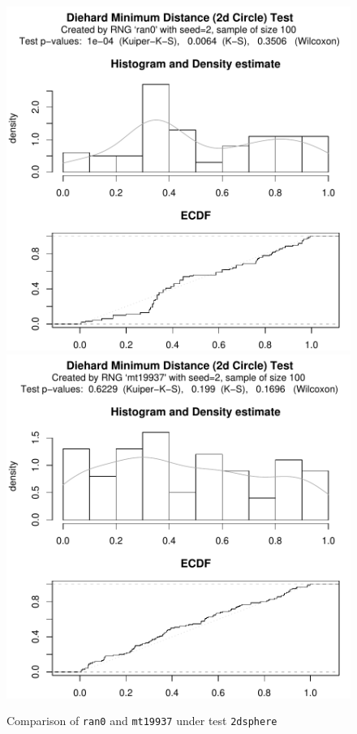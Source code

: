 \documentclass[12pt]{article}
\begin{document}
\begin{figure}[htbp]
  \begin{center}
%
\includegraphics{RDieHarder-rd-example}
\includegraphics{RDieHarder-rd-example1}
% 
\caption{Comparison of \texttt{ran0} and \texttt{mt19937} under test \texttt{2dsphere}}
\end{center}
\end{figure}
\end{document}
